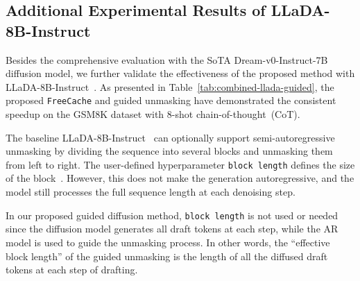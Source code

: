 \subsection{Additional Experimental Results of LLaDA-8B-Instruct}\label{sec:app-llada8b}

Besides the comprehensive evaluation with the SoTA Dream-v0-Instruct-7B diffusion model, we further validate the effectiveness of the proposed method with LLaDA-8B-Instruct~\cite{nie2025large}. 
As presented in Table~\ref{tab:combined-llada-guided}, the proposed \texttt{FreeCache} and guided unmasking have demonstrated the consistent speedup on the GSM8K dataset with 8-shot chain-of-thought~(CoT).  

The baseline LLaDA-8B-Instruct~\cite{nie2025large} can optionally support semi-autoregressive unmasking by dividing the sequence into several blocks and unmasking them from left to right. The user-defined hyperparameter \texttt{block length} defines the size of the block~\cite{nie2025large}. However, this does not make the generation autoregressive, and the model still processes the full sequence length at each denoising step.

In our proposed guided diffusion method, \texttt{block length} is not used or needed since the diffusion model generates all draft tokens at each step, while the AR model is used to guide the unmasking process. In other words, the ``effective block length'' of the guided unmasking is the length of all the diffused draft tokens at each step of drafting. 


